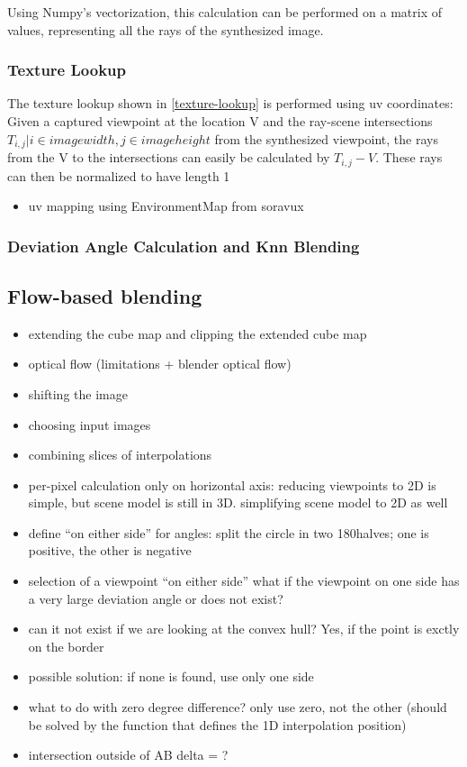Using Numpy's vectorization, this calculation can be performed on a matrix of values, representing all the rays of the synthesized image.

\subsubsection{Texture Lookup}
The texture lookup shown in \ref{texture-lookup} is performed using uv coordinates: Given a captured viewpoint at the location V and the ray-scene intersections $T_{i,j} | i \in image width, j \in image height$ from the synthesized viewpoint, the rays from the V to the intersections can easily be calculated by $T_{i,j}-V$. These rays can then be normalized to have length 1
\begin{itemize}
  \item uv mapping using EnvironmentMap from soravux
\end{itemize}

\subsubsection{Deviation Angle Calculation and Knn Blending}

\subsection{Flow-based blending}
\begin{itemize}
  \item extending the cube map and clipping the extended cube map
  \item optical flow (limitations + blender optical flow)
  \item shifting the image
  \item choosing input images
  \item combining slices of interpolations
  \item per-pixel calculation only on horizontal axis: reducing viewpoints to 2D is simple, but scene model is still in 3D. simplifying scene model to 2D as well
  \item define ``on either side'' for angles: split the circle in two 180\degree halves; one is positive, the other is negative
  \item selection of a viewpoint ``on either side'' \ar what if the viewpoint on one side has a very large deviation angle or does not exist?
  \item can it not exist if we are looking at the convex hull? Yes, if the point is exctly on the border
  \item possible solution: if none is found, use only one side
  \item what to do with zero degree difference? \ar only use zero, not the other (should be solved by the function that defines the 1D interpolation position)
  \item intersection outside of AB \ar delta = ?
\end{itemize}

